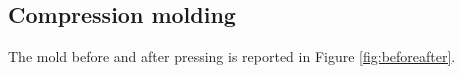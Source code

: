\documentclass[a4paper, 11pt]{article}
\begin{document}
\subsection{Compression molding}

The mold before and after pressing is reported in Figure \ref{fig:beforeafter}. 

\begin{figure}[htp]
	\centering
	 \qquad 
	\subfloat[][]

\end{figure}
\end{document}
